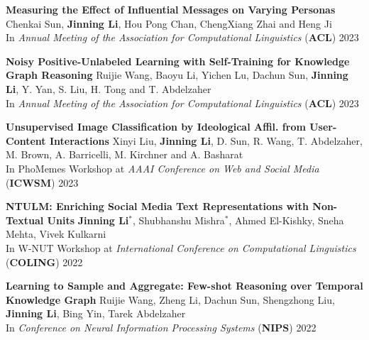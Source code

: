 \documentclass[12pt, letterpaper]{article}
\begin{document}
\textbf{Measuring the Effect of Influential Messages on Varying Personas}
\href{http://jinningli.cn/files/papers/acl_measuring.pdf}{}\href{https://github.com/chenkaisun/response_forecasting}{}
\newline
\footnotesize
Chenkai Sun, \textbf{Jinning Li}, Hou Pong Chan, ChengXiang Zhai and Heng Ji\\
In \emph{Annual Meeting of the Association for Computational Linguistics} (\textbf{ACL}) 2023
\small
\vspace{2pt}

\textbf{Noisy Positive-Unlabeled Learning with Self-Training for Knowledge Graph Reasoning}
\href{http://jinningli.cn/files/papers/acl_npugraph.pdf}{}
\newline
\footnotesize
Ruijie Wang, Baoyu Li, Yichen Lu, Dachun Sun, \textbf{Jinning Li}, Y. Yan, S. Liu, H. Tong and T. Abdelzaher\\
In \emph{Annual Meeting of the Association for Computational Linguistics} (\textbf{ACL}) 2023
\small
\vspace{2pt}

\textbf{Unsupervised Image Classification by Ideological Affil. from User-Content Interactions}
\href{http://jinningli.cn/files/papers/phomemes.pdf}{}
\newline
\footnotesize
Xinyi Liu, \textbf{Jinning Li}, D. Sun, R. Wang, T. Abdelzaher, M. Brown, A. Barricelli, M. Kirchner and A. Basharat\\
In PhoMemes Workshop at \emph{AAAI Conference on Web and Social Media} (\textbf{ICWSM}) 2023
\small
\vspace{2pt}

\textbf{NTULM: Enriching Social Media Text Representations with Non-Textual Units}
\href{https://aclanthology.org/2022.wnut-1.7/}{}
\newline
\footnotesize
\textbf{Jinning Li}$^*$, Shubhanshu Mishra$^*$, Ahmed El-Kishky, Sneha Mehta, Vivek Kulkarni\\
In W-NUT Workshop at \emph{International Conference on
Computational Linguistics} (\textbf{COLING}) 2022
\small
\vspace{2pt}

\textbf{Learning to Sample and Aggregate: Few-shot Reasoning over Temporal Knowledge Graph}
\href{https://arxiv.org/abs/2210.08654}{}
\newline
\footnotesize
Ruijie Wang, Zheng Li, Dachun Sun, Shengzhong Liu, \textbf{Jinning Li}, Bing Yin, Tarek Abdelzaher\\
In \emph{Conference on Neural Information Processing Systems} (\textbf{NIPS}) 2022
\small
\vspace{2pt}
\end{document}
